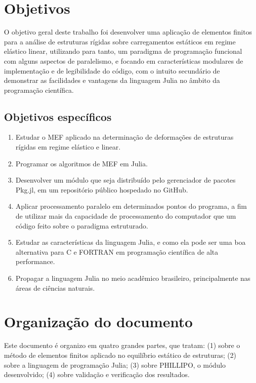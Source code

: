\section{Objetivos}

O objetivo geral deste trabalho foi desenvolver uma aplicação de elementos finitos para a análise de estruturas rígidas sobre carregamentos estáticos em regime elástico linear, utilizando para tanto, um paradigma de programação funcional com alguns aspectos de paralelismo, e focando em características modulares de implementação e de legibilidade do código, com o intuito secundário de demonstrar as facilidades e vantagens da linguagem Julia no âmbito da programação científica.

\subsection{Objetivos específicos}

\begin{enumerate}
    \item Estudar o MEF aplicado na determinação de deformações de estruturas rígidas em regime elástico e linear.
    \item Programar os algoritmos de MEF em Julia.
    \item Desenvolver um módulo que seja distribuído pelo gerenciador de pacotes Pkg.jl, em um repositório público hospedado no GitHub.
    \item Aplicar processamento paralelo em determinados pontos do programa, a fim de utilizar mais da capacidade de processamento do computador que um código feito sobre o paradigma estruturado.
    \item Estudar as características da linguagem Julia, e como ela pode ser uma boa alternativa para C e FORTRAN em programação científica de alta performance.
    \item Propagar a linguagem Julia no meio acadêmico brasileiro, principalmente nas áreas de ciências naturais.
\end{enumerate}

\section{Organização do documento}

Este documento é organizo em quatro grandes partes, que tratam: (1) sobre o método de elementos finitos aplicado no equilíbrio estático de estruturas; (2) sobre a linguagem de programação Julia; (3) sobre PHILLIPO, o módulo desenvolvido; (4) sobre validação e verificação dos resultados.

